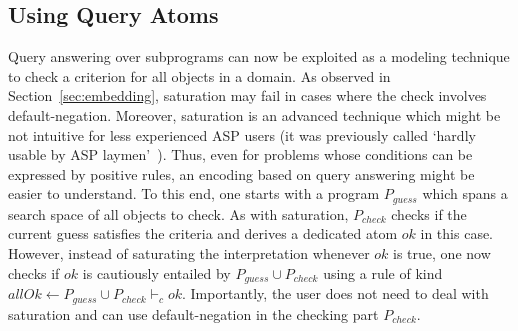 \documentclass[11pt,fleqn,twoside]{article}
\newcommand{\nop}[1]{}
\newtheorem{example}{Example}
\begin{document}
		\subsection{Using Query Atoms}
		\label{sec:defaultNegation}

			Query answering over subprograms can now be exploited as a modeling technique to check a criterion for all objects in a domain.
			As observed in Section~\ref{sec:embedding}, saturation may fail in cases where the check involves default-negation.
			Moreover, saturation is an advanced technique which might be not intuitive for less experienced ASP users
			(it was previously called `hardly usable by ASP laymen'~\cite{DBLP:journals/corr/abs-1107-5742}).
			Thus, even for problems whose conditions can be expressed by positive rules, an encoding based on query answering might be easier to understand.
			To this end, one starts with a program $P_{\mathit{guess}}$ which spans a search space of all objects to check.
			As with saturation, $P_{\mathit{check}}$ checks if the current guess satisfies the criteria and derives a dedicated atom $\mathit{ok}$ in this case.
			However, instead of saturating the interpretation whenever $\mathit{ok}$ is true, one now checks if $\mathit{ok}$ is cautiously entailed by $P_{\mathit{guess}} \cup P_{\mathit{check}}$
			using a rule of kind $\mathit{allOk} \leftarrow P_{\mathit{guess}} \cup P_{\mathit{check}} \vdash_c \mathit{ok}$.
			Importantly, the user does not need to deal with saturation and can use default-negation in the checking part $P_{\mathit{check}}$.

			\nop{
			\begin{example}
				For the program from Example~\ref{ex:non3col},
				$[\{ \mathit{not3col} \leftarrow P_{\mathit{guess}} \cup P_{\mathit{check}} \vdash_c \mathit{sat} \}]$
				always has at least one answer set
				and in each answer set, $\mathit{not3col}$ represents that the graph is not 3-colorable.
			\end{example}
			}
			
\end{document}
